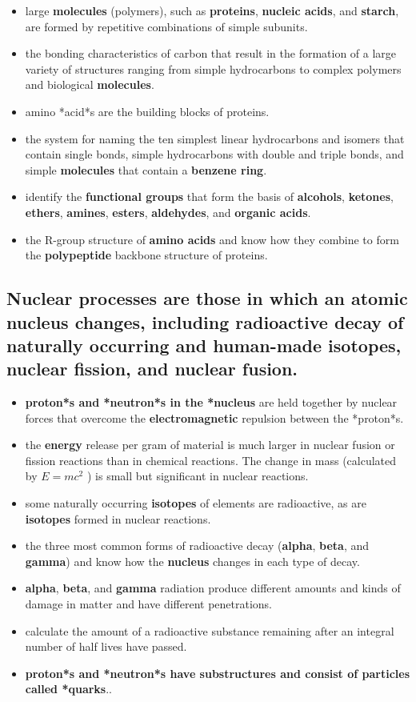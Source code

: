 \documentclass[11pt]{article}
\begin{document}
\begin{itemize}
\item large \textbf{molecules} (polymers), such as \textbf{proteins}, \textbf{nucleic acids}, and \textbf{starch}, are formed by repetitive combinations of simple subunits.
\item the bonding characteristics of carbon that result in the formation of a large variety of structures ranging from simple hydrocarbons to complex polymers and biological \textbf{molecules}.
\item amino *acid*s are the building blocks of proteins.
\item the system for naming the ten simplest linear hydrocarbons and isomers that contain single bonds, simple hydrocarbons with double and triple bonds, and simple \textbf{molecules} that contain a \textbf{benzene ring}.
\item identify the \textbf{functional groups} that form the basis of \textbf{alcohols}, \textbf{ketones}, \textbf{ethers}, \textbf{amines}, \textbf{esters}, \textbf{aldehydes}, and \textbf{organic acids}.
\item the R-group structure of \textbf{amino acids} and know how they combine to form the \textbf{polypeptide} backbone structure of proteins.
\end{itemize}
\subsection{Nuclear processes are those in which an atomic \textbf{nucleus} changes, including radioactive decay of naturally occurring and human-made \textbf{isotopes}, nuclear fission, and nuclear fusion.}
\label{sec:org76c8016}

\begin{itemize}
\item \textbf{proton*s and *neutron*s in the *nucleus} are held together by nuclear forces that overcome the \textbf{electromagnetic} repulsion between the *proton*s.
\item the \textbf{energy} release per gram of material is much larger in nuclear fusion or fission reactions than in chemical reactions. The change in mass (calculated by \(E = mc^2\) ) is small but significant in nuclear reactions.
\item some naturally occurring \textbf{isotopes} of elements are radioactive, as are \textbf{isotopes} formed in nuclear reactions.
\item the three most common forms of radioactive decay (\textbf{alpha}, \textbf{beta}, and \textbf{gamma}) and know how the \textbf{nucleus} changes in each type of decay.
\item \textbf{alpha}, \textbf{beta}, and \textbf{gamma} radiation produce different amounts and kinds of damage in matter and have different penetrations.
\item calculate the amount of a radioactive substance remaining after an integral number of half lives have passed.
\item \textbf{proton*s and *neutron*s have substructures and consist of particles called *quarks}..
\end{itemize}
\end{document}
